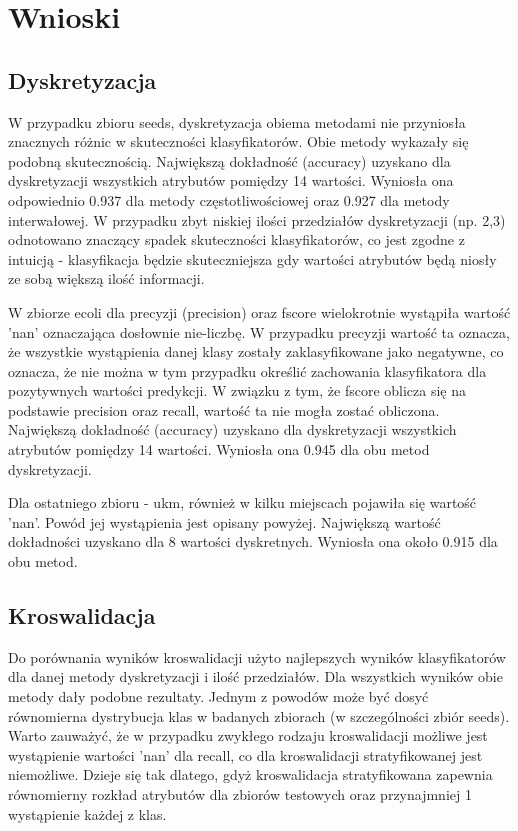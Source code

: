\chapter{Wnioski}
\section{Dyskretyzacja}
W przypadku zbioru seeds, dyskretyzacja obiema metodami nie przyniosła znacznych różnic w skuteczności klasyfikatorów. Obie metody wykazały się podobną skutecznością. Największą dokładność (accuracy) uzyskano dla dyskretyzacji wszystkich atrybutów pomiędzy 14 wartości. Wyniosła ona odpowiednio 0.937 dla metody częstotliwościowej oraz 0.927 dla metody interwałowej. W przypadku zbyt niskiej ilości przedziałów dyskretyzacji (np. 2,3) odnotowano znaczący spadek skuteczności klasyfikatorów, co jest zgodne z intuicją - klasyfikacja będzie skuteczniejsza gdy wartości atrybutów będą niosły ze sobą większą ilość informacji.

W zbiorze ecoli dla precyzji (precision) oraz fscore wielokrotnie wystąpiła wartość 'nan' oznaczająca dosłownie nie-liczbę. W przypadku precyzji wartość ta oznacza, że wszystkie wystąpienia danej klasy zostały zaklasyfikowane jako negatywne, co oznacza, że nie można w tym przypadku określić zachowania klasyfikatora dla pozytywnych wartości predykcji. W związku z tym, że fscore oblicza się na podstawie precision oraz recall, wartość ta nie mogła zostać obliczona. Największą dokładność (accuracy) uzyskano dla dyskretyzacji wszystkich atrybutów pomiędzy 14 wartości. Wyniosła ona 0.945 dla obu metod dyskretyzacji.

Dla ostatniego zbioru - ukm, również w kilku miejscach pojawiła się wartość 'nan'. Powód jej wystąpienia jest opisany powyżej. Największą wartość dokładności uzyskano dla 8 wartości dyskretnych. Wyniosła ona około 0.915 dla obu metod.

\section{Kroswalidacja}
Do porównania wyników kroswalidacji użyto najlepszych wyników klasyfikatorów dla danej metody dyskretyzacji i ilość przedziałów. Dla wszystkich wyników obie metody dały podobne rezultaty. Jednym z powodów może być dosyć równomierna dystrybucja klas w badanych zbiorach (w szczególności zbiór seeds). Warto zauważyć, że w przypadku zwykłego rodzaju kroswalidacji możliwe jest wystąpienie wartości 'nan' dla recall, co dla kroswalidacji stratyfikowanej jest niemożliwe. Dzieje się tak dlatego, gdyż kroswalidacja stratyfikowana zapewnia równomierny rozkład atrybutów dla zbiorów testowych oraz przynajmniej 1 wystąpienie każdej z klas.
\newpage
